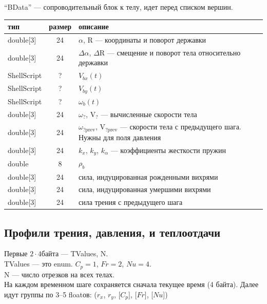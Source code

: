 \documentclass[14pt]{extreport}
\newcommand{\br}[1]{\boldsymbol{\mathrm{#1}}}
\renewcommand{\vec}[1]{\br{#1}}
\begin{document}
``BData'' --- сопроводительный блок к телу, идет перед списком вершин.
\begin{tabular}{lcl}
\hline
тип & размер & описание\\\hline
double[3]    & 24 & $\alpha$, $\vec R$ --- координаты и поворот державки\\
double[3]    & 24 & $\Delta\alpha$, $\Delta\vec R$ --- смещение и поворот тела относительно державки\\
ShellScript  & ?  & $V_{bx}(t)$\\
ShellScript  & ?  & $V_{by}(t)$\\
ShellScript  & ?  & $\omega_{b}(t)$\\
double[3]    & 24 & $\omega_?$, $\vec V_?$ --- вычисленные скорости тела\\
double[3]    & 24 & $\omega_{?\text{prev}}$, $\vec V_{?\text{prev}}$ --- скорости тела с предыдущего шага. Нужны для поля давления\\
double[3]    & 24 & $k_x$, $k_y$, $k_\alpha$ --- коэффициенты жесткости пружин\\
double       & 8  & $\rho_b$\\
double[3]    & 24 & сила, индуцированная рожденными вихрями\\
double[3]    & 24 & сила, индуцированная умершими вихрями\\
double[3]    & 24 & сила трения с предыдущего шага\\
\hline
\end{tabular}

\subsection{Профили трения, давления, и теплоотдачи}
Первые $2 \cdot 4$байта --- TValues, N.\\
TValues --- это enum. $C_p=1$, $Fr=2$, $Nu=4$.\\
N --- число отрезков на всех телах.\\
На каждом временном шаге сохраняется сначала текущее время (4 байта). Далее идут группы по 3--5 floatов: ($r_x$, $r_y$, [$C_p$], [$Fr$], [$Nu$])
\end{document}
